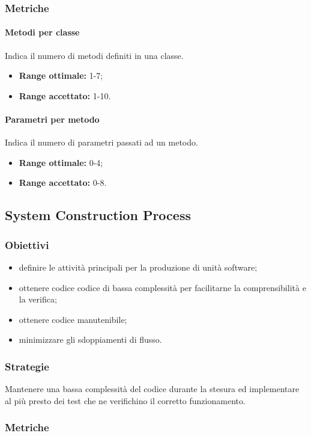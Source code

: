 		\subsubsection{Metriche}
			\paragraph{Metodi per classe}
			Indica il numero di metodi definiti in una classe.
			\begin{itemize}
				\item \textbf{Range ottimale:} 1-7; 
				\item \textbf{Range accettato:} 1-10.
			\end{itemize}
			\paragraph{Parametri per metodo}
			Indica il numero di parametri passati ad un metodo.
			\begin{itemize}
				\item \textbf{Range ottimale:} 0-4;
				\item \textbf{Range accettato:} 0-8.
			\end{itemize}
			
	\subsection{System Construction Process}
		\subsubsection{Obiettivi}
		\begin{itemize}
			\item definire le attività principali per la produzione di unità software;
			\item ottenere codice codice di bassa complessità per facilitarne la comprensibilità e la verifica;
			\item ottenere codice manutenibile;
			\item minimizzare gli sdoppiamenti di flusso.
		\end{itemize}
		\subsubsection{Strategie}
		Mantenere una bassa complessità del codice durante la stesura ed implementare al più presto dei test che ne verifichino il corretto funzionamento.
		\subsubsection{Metriche}
